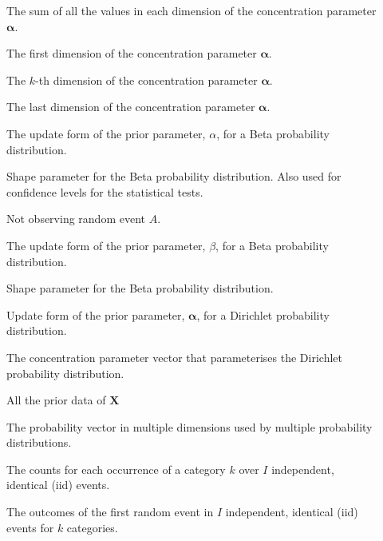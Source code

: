 \begin{description}
	\item [\parbox{2cm}{$\alpha_{0}$}] \parbox{12.5cm}{The sum of all the values in each dimension of the concentration parameter $\boldsymbol{\alpha}$.}
	\item [\parbox{2cm}{$\alpha_{1}$}] \parbox{12.5cm}{The first dimension of the concentration parameter $\boldsymbol{\alpha}$.}
	\item [\parbox{2cm}{$\alpha_{k}$}] \parbox{12.5cm}{The $k$-th dimension of the concentration parameter $\boldsymbol{\alpha}$.}
	\item [\parbox{2cm}{$\alpha_{K}$}] \parbox{12.5cm}{The last dimension of the concentration parameter $\boldsymbol{\alpha}$.}
	\item [\parbox{2cm}{$\alpha'$}] \parbox{12.5cm}{The update form of the prior parameter, $\alpha$, for a Beta probability distribution.}
	\item [\parbox{2cm}{$\alpha$}] \parbox{12.5cm}{Shape parameter for the Beta probability distribution. Also used for confidence levels for the statistical tests.}
	\item [\parbox{2cm}{$\bar{A}$}] \parbox{12.5cm}{Not observing random event $A$.}
	\item [\parbox{2cm}{$\beta'$}] \parbox{12.5cm}{The update form of the prior parameter, $\beta$, for a Beta probability distribution.}
	\item [\parbox{2cm}{$\beta$}] \parbox{12.5cm}{Shape parameter for the Beta probability distribution.}
	\item [\parbox{2cm}{$\boldsymbol{\alpha'}$}] \parbox{12.5cm}{Update form of the prior parameter, $\boldsymbol{\alpha}$, for a Dirichlet probability distribution.}
	\item [\parbox{2cm}{$\boldsymbol{\alpha}$}] \parbox{12.5cm}{The concentration parameter vector that parameterises the Dirichlet probability distribution.}
	\item [\parbox{2cm}{$\boldsymbol{\mathcal{D}}$}] \parbox{12.5cm}{All the prior data of $\boldsymbol{X}$}
	\item [\parbox{2cm}{$\boldsymbol{\theta}$}] \parbox{12.5cm}{The probability vector in multiple dimensions used by multiple probability distributions.}
	\item [\parbox{2cm}{$\boldsymbol{N}$}] \parbox{12.5cm}{The counts for each occurrence of a category $k$ over $I$ independent, identical (iid) events.}
	\item [\parbox{2cm}{$\boldsymbol{x_{1}}$}] \parbox{12.5cm}{The outcomes of the first random event in $I$ independent, identical (iid) events for $k$ categories.}

\end{description}
